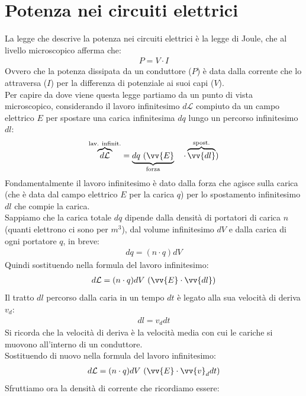 \documentclass[a4paper, oneside]{article}
\begin{document}
\section*{Potenza nei circuiti elettrici}
La legge che descrive la potenza nei circuiti elettrici è la legge di Joule, che al livello microscopico afferma che:
\begin{gather*}
    P = V \cdot I
\end{gather*}
Ovvero che la potenza dissipata da un conduttore ($P$) è data dalla corrente che lo attraversa ($I$) per la differenza di potenziale ai suoi capi ($V$).\\
Per capire da dove viene questa legge partiamo da un punto di vista microscopico, considerando il lavoro infinitesimo $d\mathcal{L}$ compiuto da un campo elettrico $E$ per spostare una carica infinitesima $dq$ lungo un percorso infinitesimo $dl$:
\begin{gather*}
    \overbrace{d\mathcal{L}}^\text{lav. infinit.} = \underbrace{dq \ ( \vv{E}}_\text{forza} \quad\cdot \overbrace{\vv{dl}}^\text{spost.} )
\end{gather*}
Fondamentalmente il lavoro infinitesimo è dato dalla forza che agisce sulla carica (che è data dal campo elettrico $E$ per la carica $q$) per lo spostamento infinitesimo $dl$ che compie la carica.\\
Sappiamo che la carica totale $dq$ dipende dalla densità di portatori di carica $n$ (quanti elettrono ci sono per $m^3$), dal volume infinitesimo $dV$ e dalla carica di ogni portatore $q$, in breve:
\begin{gather*}
    dq = (n \cdot q) dV
\end{gather*}
Quindi sostituendo nella formula del lavoro infinitesimo:
\begin{gather*}
    d \mathcal{L} = (n \cdot q) dV \ (\vv{E} \cdot \vv{dl})
\end{gather*}
Il tratto $dl$ percorso dalla caria in un tempo $dt$ è legato alla sua velocità di deriva $v_d$:
\begin{gather*}
    dl = v_d dt
\end{gather*}
Si ricorda che la velocità di deriva è la velocità media con cui le cariche si muovono all'interno di un conduttore.\\
Sostituendo di nuovo nella formula del lavoro infinitesimo:
\begin{gather*}
    d\mathcal{L} = (n \cdot q) dV \ (\vv{E} \cdot \vv{v}_d dt)
\end{gather*}
Sfruttiamo ora la densità di corrente che ricordiamo essere:
\end{document}
